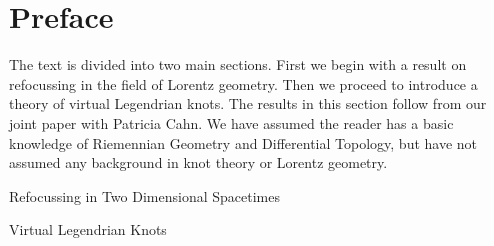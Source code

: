 \documentclass[copyright, final]{dcthesis}
\numberwithin{equation}{section}
\theoremstyle{plain}
\theoremstyle{definition}
\theoremstyle{definition}
\theoremstyle{remark}
\begin{document}
\section*{Preface}
The text is divided into two main sections.  First we begin with a result on refocussing in the field of Lorentz geometry.  Then we proceed to introduce a theory of virtual Legendrian knots.  The results in this section follow from our joint paper with Patricia Cahn.  We have assumed the reader has a basic knowledge of Riemennian Geometry and Differential Topology, but have not assumed any background in knot theory or Lorentz geometry.


\tableofcontents

\listoftables



\mainmatter

\begin{chapter}{Refocussing in Two Dimensional Spacetimes}\label{ch refocussing}

\end{chapter}

\begin{chapter}{Virtual Legendrian Knots}\label{ch vlk}

\end{chapter}
%

\backmatter


\cleardoublepage

\cleardoublepage

\nocite{BGRL2001}

{}


\end{document}
